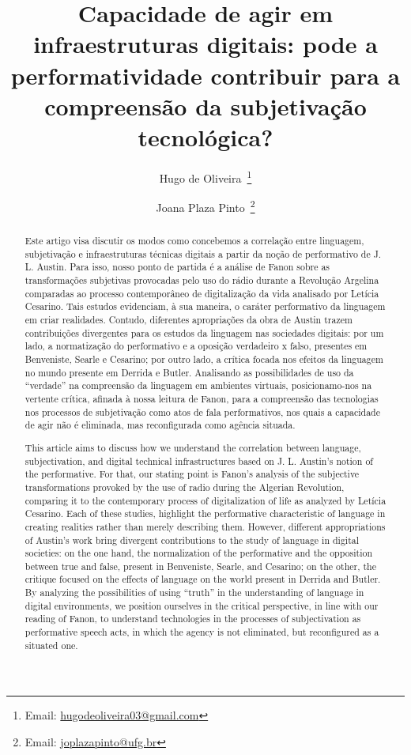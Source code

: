 \documentclass[portuguese]{textolivre}
\title{Capacidade de agir em infraestruturas digitais: pode a performatividade contribuir para a compreensão da subjetivação tecnológica?}
\author[1]{Hugo de Oliveira~\orcid{0000-0001-6412-8116}\thanks{Email: \href{mailto:hugodeoliveira03@gmail.com}{hugodeoliveira03@gmail.com}}}
\author[2]{Joana Plaza Pinto~\orcid{0000-0001-8052-9390}\thanks{Email: \href{mailto:joplazapinto@ufg.br}{joplazapinto@ufg.br}}}
\affil[1]{Universidade Federal de Goiás, Faculdade de Ciências Sociais, Programa de Pós-Graduação em Sociologia, Goiânia, GO, Brasil.}
\affil[2]{Universidade Federal de Goiás, Faculdade de Letras, Departamento de Linguística e Língua Portuguesa,
Goiânia, GO, Brasil.}
\begin{document}
\maketitle

\begin{polyabstract}
\begin{abstract}
Este artigo visa discutir os modos como concebemos a correlação entre linguagem, subjetivação e infraestruturas técnicas digitais a partir da noção de performativo de J. L. Austin. Para isso, nosso ponto de partida é a análise de Fanon sobre as transformações subjetivas provocadas pelo uso do rádio durante a Revolução Argelina comparadas ao processo contemporâneo de digitalização da vida analisado por Letícia Cesarino. Tais estudos evidenciam, à sua maneira, o caráter performativo da linguagem em criar realidades. Contudo, diferentes apropriações da obra de Austin trazem contribuições divergentes para os estudos da linguagem nas sociedades digitais: por um lado, a normatização do performativo e a oposição verdadeiro x falso, presentes em Benveniste, Searle e Cesarino; por outro lado, a crítica focada nos efeitos da linguagem no mundo presente em Derrida e Butler. Analisando as possibilidades de uso da “verdade” na compreensão da linguagem em ambientes virtuais, posicionamo-nos na vertente crítica, afinada à nossa leitura de Fanon, para a compreensão das tecnologias nos processos de subjetivação como atos de fala performativos, nos quais a capacidade de agir não é eliminada, mas reconfigurada como agência situada.

\end{abstract}

\begin{english}
\begin{abstract}
This article aims to discuss how we understand the correlation between language, subjectivation, and digital technical infrastructures based on J. L. Austin’s notion of the performative. For that, our stating point is Fanon’s analysis of the subjective transformations provoked by the use of radio during the Algerian Revolution, comparing it to the contemporary process of digitalization of life as analyzed by Letícia Cesarino. Each of these studies, highlight the performative characteristic of language in creating realities rather than merely describing them. However, different appropriations of Austin’s work bring divergent contributions to the study of language in digital societies: on the one hand, the normalization of the performative and the opposition between true and false, present in Benveniste, Searle, and Cesarino; on the other, the critique focused on the effects of language on the world present in Derrida and Butler. By analyzing the possibilities of using “truth” in the understanding of language in digital environments, we position ourselves in the critical perspective, in line with our reading of Fanon, to understand technologies in the processes of subjectivation as performative speech acts, in which the agency is not eliminated, but reconfigured as a situated one.


\end{abstract}
\end{english}
\end{polyabstract}
\end{document}
